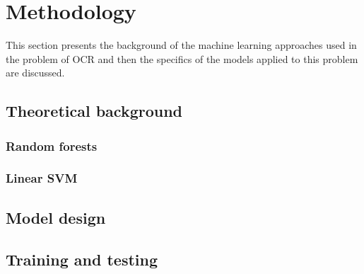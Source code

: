 \section{Methodology}
This section presents the background of the machine learning approaches used in the problem of OCR and then the specifics of the models applied to this problem are discussed. 
\subsection{Theoretical background}
\subsubsection{Random forests}
\subsubsection{Linear SVM}
\subsection{Model design}
\subsection{Training and testing}




